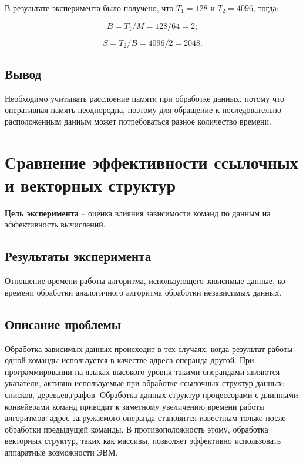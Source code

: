 В результате эксперимента было получено, что $T_1 = 128$ и $T_2 = 4096$, тогда:

\begin{equation}
	B = T_1 / M = 128 / 64 = 2;
\end{equation}

\begin{equation}
	S = T_2 / B = 4096 / 2 = 2048.
\end{equation}


\subsection{Вывод}

Необходимо учитывать расслоение памяти при обработке данных, потому что оперативная память неоднородна, поэтому для обращение к последовательно расположенным данным может потребоваться разное количество времени.



\section{Сравнение эффективности ссылочных и векторных структур}

\textbf{Цель эксперимента} -- оценка   влияния   зависимости   команд   по   данным   на эффективность вычислений.

\subsection{Результаты эксперимента}
Отношение времени работы алгоритма, использующего зависимые данные, ко времени обработки аналогичного алгоритма обработки независимых данных.

\subsection{Описание проблемы}
Обработка зависимых данных происходит в тех случаях, когда результат работы одной команды используется в качестве адреса операнда другой. При программировании на языках высокого уровня такими операндами являются указатели, активно используемые при обработке ссылочных структур данных: списков, деревьев,графов. Обработка данных структур процессорами с длинными конвейерами команд приводит к заметному увеличению  времени работы алгоритмов: адрес загружаемого операнда   становится   известным   только   после   обработки   предыдущей   команды.   В противоположность этому, обработка векторных структур, таких как массивы, позволяет эффективно использовать аппаратные возможности ЭВМ.

